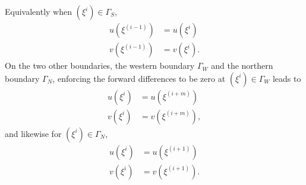Equivalently when $(\xi^{i}) \in \Gamma_S$,
\begin{align}
\label{neumann3}
u(\xi^{(i-1)}) &= u(\xi^{i})  \\
\label{neumann4}
v(\xi^{(i-1)}) &= v(\xi^{i}).
\end{align}
On the two other boundaries, the western boundary $\Gamma_W$ and the northern boundary $\Gamma_N$, enforcing the forward differences to be zero at $(\xi^i) \in \Gamma_W$ leads to
\begin{align}
\label{neumann5}
u(\xi^i) &= u(\xi^{(i+m)})  \\
\label{neumann6}
v(\xi^i) &= v(\xi^{(i+m)}), 
\end{align}
and likewise for $(\xi^i) \in \Gamma_N$,
\begin{align}
\label{neumann7}
u(\xi^i) &= u(\xi^{(i+1)})  \\
\label{neumann8}
v(\xi^i) &= v(\xi^{(i+1)}).
\end{align}



